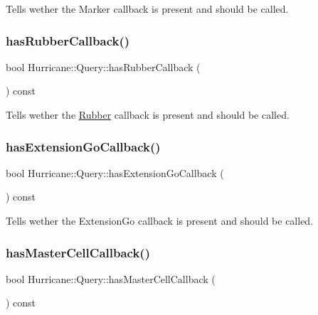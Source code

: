 Tells wether the Marker callback is present and should be called. \mbox{\label{classHurricane_1_1Query_a5d49250d46dea1542bc3034f3eb1daee}} 
\subsubsection{\texorpdfstring{has\+Rubber\+Callback()}{hasRubberCallback()}}
{\footnotesize\ttfamily bool Hurricane\+::\+Query\+::has\+Rubber\+Callback (\begin{DoxyParamCaption}{ }\end{DoxyParamCaption}) const\hspace{0.3cm}{\ttfamily [virtual]}}

Tells wether the \mbox{\hyperlink{classHurricane_1_1Rubber}{Rubber}} callback is present and should be called. \mbox{\label{classHurricane_1_1Query_abd8ff8d187e4499e625feb12c68e9b29}} 
\subsubsection{\texorpdfstring{has\+Extension\+Go\+Callback()}{hasExtensionGoCallback()}}
{\footnotesize\ttfamily bool Hurricane\+::\+Query\+::has\+Extension\+Go\+Callback (\begin{DoxyParamCaption}{ }\end{DoxyParamCaption}) const\hspace{0.3cm}{\ttfamily [virtual]}}

Tells wether the Extension\+Go callback is present and should be called. \mbox{\label{classHurricane_1_1Query_a7ebb7b16bab183cd4508dc5639bd12ab}} 
\subsubsection{\texorpdfstring{has\+Master\+Cell\+Callback()}{hasMasterCellCallback()}}
{\footnotesize\ttfamily bool Hurricane\+::\+Query\+::has\+Master\+Cell\+Callback (\begin{DoxyParamCaption}{ }\end{DoxyParamCaption}) const\hspace{0.3cm}{\ttfamily [virtual]}}

